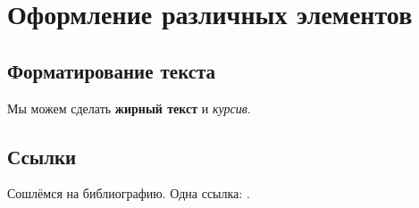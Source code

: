 \documentclass[a4paper,14pt,oneside,openany]{memoir}
\begin{document}
\chapter{Оформление различных элементов} \label{chapt1}

\section{Форматирование текста} \label{sect1_1}


Мы можем сделать \textbf{жирный текст} и \textit{курсив}.


\section{Ссылки} \label{sect1_2}
Сошлёмся на библиографию.
\cite{Olikh:Visn2003,Olikh:SPQEO2003,Olikh:SEMT2004,Olikh:PJE2004,Olikh:PhChOM2005,
Olikh:PZTF2006,Olikh:MRS2007,Olikh:SEMT2007,Olikh:Visn2007,Olikh:FTP2009,Olikh:SPQEO2010,Gorb2010,
Olikh:UPJ2010,Olikh:SEMT2011,Olikh:FTP2011,Olikh:2013IEEE,Olikh:UPJ2013,Olikh:FTP2013,Olikh:SEMT2013,
Olikh:UPJ2014,Olikh:Ultras,OlikhJAP,Olikh:Rev,Olikh:Ultras2016,Olikh2016JSem,Olikh2018JAP,
1UNCPS,3Tomsk,1SEMST,50IUFFC,9APTTE,2005IUS,ICU2007SC,ICU2007GA,2007MRS,3UNCPS,6DrogGorb,6Drog,
12IvFr,4UNCPS,4Kremen,7Drog,5UNCPS,2012Ternop,14Plivk,8Drog,2013Buk,6UNCPS,2014IUSOl,2014IUS,6SEMST,
2015ICU,6CPFCS,7UNCPS,2017MEICS}
Одна ссылка: \cite[с.~54]{OlikhJAP}.


\end{document}
